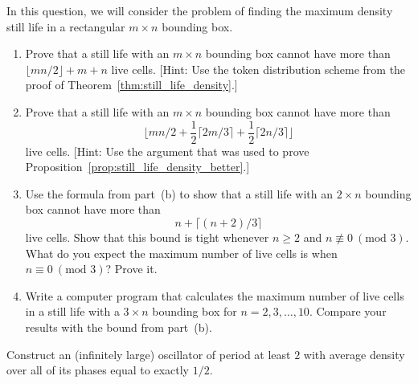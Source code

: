 \begin{multicols}{2}
	
	\mfilbreak
	
	
	\begin{problem}\label{exer:still_life_density_rectangle}
		In this question, we will consider the problem of finding the maximum density still life in a rectangular $m \times n$ bounding box.\smallskip
		
		\begin{enumerate}[label=\bf\color{ocre}(\alph*)]
			\item Prove that a still life with an $m \times n$ bounding box cannot have more than $\lfloor mn/2 \rfloor + m + n$ live cells. [Hint: Use the token distribution scheme from the proof of Theorem~\ref{thm:still_life_density}.]
			
			\item Prove that a still life with an $m \times n$ bounding box cannot have more than $$\Big\lfloor mn/2 + \frac{1}{2}\lceil 2m/3 \rceil + \frac{1}{2}\lceil 2n/3 \rceil \Big\rfloor$$ live cells. [Hint: Use the argument that was used to prove Proposition~\ref{prop:still_life_density_better}.]
			
			\item Use the formula from part~(b) to show that a still life with an $2 \times n$ bounding box cannot have more than
			$$
			n + \big\lceil(n+2)/3\big\rceil
			$$
			live cells. Show that this bound is tight whenever $n \geq 2$ and $n \not\equiv 0 \ (\text{mod } 3)$. What do you expect the maximum number of live cells is when $n \equiv 0 \ (\text{mod } 3)$? Prove it.
			
			\item Write a computer program that calculates the maximum number of live cells in a still life with a $3 \times n$ bounding box for $n = 2, 3, \ldots, 10$. Compare your results with the bound from part~(b).
		\end{enumerate}
	\end{problem}
	
	
	\mfilbreak
	
	
	\begin{problem}\label{exer:dense_oscillator}
		Construct an (infinitely large) oscillator of period at least $2$ with average density over all of its phases equal to exactly $1/2$.
	\end{problem}
	
\end{multicols}
\normalsize\vspace*{0.01cm}
